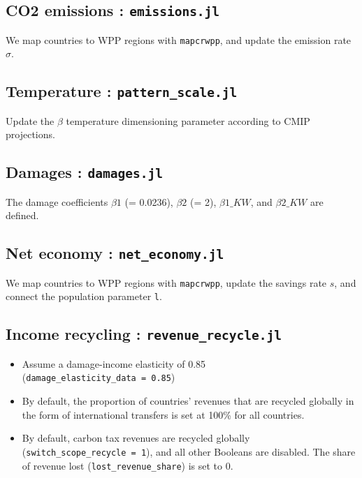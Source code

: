 \documentclass[
]{article}
\providecommand{\tightlist}{%
  \setlength{\itemsep}{0pt}\setlength{\parskip}{0pt}}
\begin{document}
\subsection{\texorpdfstring{CO2 emissions :
\texttt{emissions.jl}}{CO2 emissions : emissions.jl}}\label{co2-emissions-emissions.jl}

We map countries to WPP regions with \texttt{mapcrwpp}, and update the
emission rate \(\sigma\).

\subsection{\texorpdfstring{Temperature :
\texttt{pattern\_scale.jl}}{Temperature : pattern\_scale.jl}}\label{temperature-pattern_scale.jl}

Update the \(\beta\) temperature dimensioning parameter according to
CMIP projections.

\subsection{\texorpdfstring{Damages :
\texttt{damages.jl}}{Damages : damages.jl}}\label{damages-damages.jl}

The damage coefficients $\beta1$ (= 0.0236), $\beta2$ (= 2), $\beta1\_KW$, and $\beta2\_KW$ are
defined.

\subsection{\texorpdfstring{Net economy :
\texttt{net\_economy.jl}}{Net economy : net\_economy.jl}}\label{net-economy-net_economy.jl}

We map countries to WPP regions with \texttt{mapcrwpp}, update the
savings rate \(s\), and connect the population parameter \texttt{l}.

\subsection{\texorpdfstring{Income recycling :
\texttt{revenue\_recycle.jl}}{Income recycling : revenue\_recycle.jl}}\label{income-recycling-revenue_recycle.jl}

\begin{itemize}
\tightlist
\item
  Assume a damage-income elasticity of 0.85
  (\texttt{damage\_elasticity\_data\ =\ 0.85})
\item
  By default, the proportion of countries' revenues that are recycled
  globally in the form of international transfers is set at 100\% for
  all countries.
\item
  By default, carbon tax revenues are recycled globally
  (\texttt{switch\_scope\_recycle\ =\ 1}), and all other Booleans are
  disabled. The share of revenue lost (\texttt{lost\_revenue\_share}) is
  set to 0.

\end{itemize}
\end{document}
